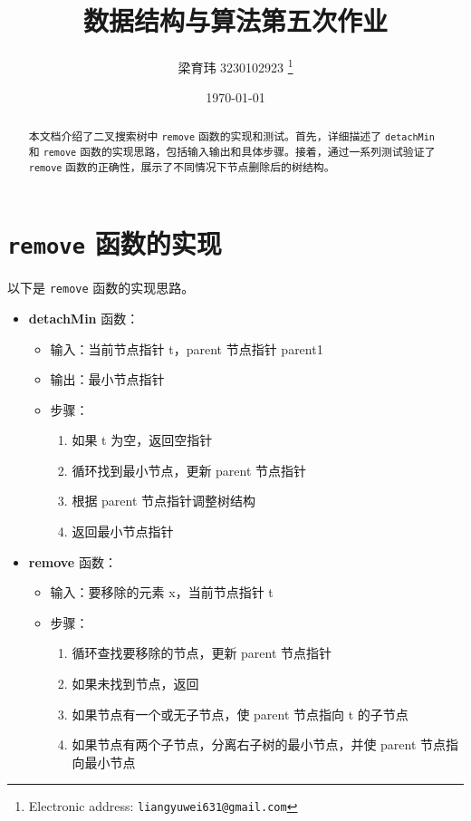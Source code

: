 \documentclass[UTF8]{ctexart}
\begin{document}
\pagestyle{fancy}
\fancyhead{}
\rhead{\today}
\title{数据结构与算法第五次作业}

\author{梁育玮 3230102923
  \thanks{Electronic address: \texttt{liangyuwei631@gmail.com}}}


\date{\today}

\maketitle
\begin{abstract}
    本文档介绍了二叉搜索树中 \texttt{remove} 函数的实现和测试。首先，详细描述了 \texttt{detachMin} 和 \texttt{remove} 函数的实现思路，包括输入输出和具体步骤。接着，通过一系列测试验证了 \texttt{remove} 函数的正确性，展示了不同情况下节点删除后的树结构。
\end{abstract}

\section{\texttt{remove} 函数的实现}

以下是 \texttt{remove} 函数的实现思路。
\begin{itemize}
    \item \textbf{detachMin} 函数：
    \begin{itemize}
        \item 输入：当前节点指针 t，parent 节点指针 parent1
        \item 输出：最小节点指针
        \item 步骤：
        \begin{enumerate}
            \item 如果 t 为空，返回空指针
            \item 循环找到最小节点，更新 parent 节点指针
            \item 根据 parent 节点指针调整树结构
            \item 返回最小节点指针
        \end{enumerate}
    \end{itemize}
    \item \textbf{remove} 函数：
    \begin{itemize}
        \item 输入：要移除的元素 x，当前节点指针 t
        \item 步骤：
        \begin{enumerate}
            \item 循环查找要移除的节点，更新 parent 节点指针
            \item 如果未找到节点，返回
            \item 如果节点有一个或无子节点，使 parent 节点指向 t 的子节点 
            \item 如果节点有两个子节点，分离右子树的最小节点，并使 parent 节点指向最小节点
        \end{enumerate}
    \end{itemize}
\end{itemize}
\end{document}

